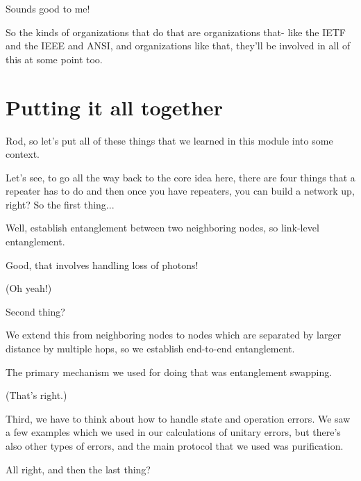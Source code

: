 \rrr Sounds good to me!

So the kinds of organizations that do that are organizations that- like the IETF and the IEEE and ANSI, and organizations like that, they'll be involved in all of this at some point too.

\section{Putting it all together}


\mmm Rod, so let's put all of these things that we learned in this module into some context.



\rrr Let's see, to go all the way back to the core idea here, there are four things that a repeater has to do and then once you have repeaters, you can build a network up, right? So the first thing...

\mmm Well, establish entanglement between two neighboring nodes, so link-level entanglement.

\rrr Good, that involves handling loss of photons!

\mmm (Oh yeah!)

\rrr Second thing?

\mmm We extend this from neighboring nodes to nodes which are separated by larger distance by multiple hops, so we establish end-to-end entanglement.

\rrr The primary mechanism we used for doing that was entanglement swapping. 

\mmm (That's right.)

Third, we have to think about how to handle state and operation errors. We saw a few examples which we used in our calculations of unitary errors, but there's also other types of errors, and the main protocol that we used was purification.

\rrr All right, and then the last thing?

